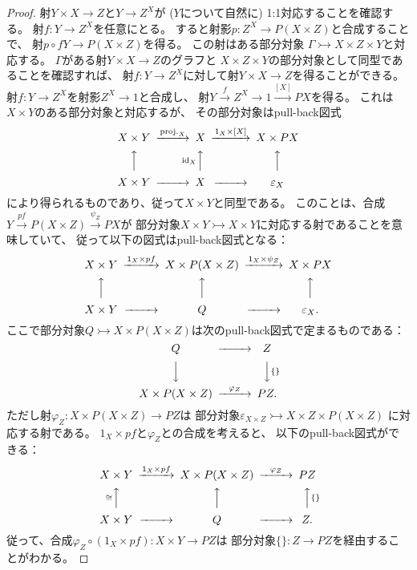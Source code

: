 \documentclass[uplatex]{jsarticle}
\theoremstyle{definition}
\def\ep{\varepsilon}
\def\id{\mathrm{id}}
\newcommand{\rtot}{\rightarrowtail}
\begin{document}
\begin{proof}
  射\(Y\times X\to Z\)と\(Y\to Z^X\)が (\(Y\)について自然に) 1:1対応することを確認する。
  射\(f:Y\to Z^X\)を任意にとる。
  すると射影\(p:Z^X \to P(X\times Z)\)と合成することで、
  射\(p\circ f Y\to P(X\times Z)\)を得る。
  この射はある部分対象
  \(\Gamma \rtot X\times Z\times Y\)と対応する。
  \(\Gamma\)がある射\(Y\times X\to Z\)のグラフと
  \(X\times Z\times Y\)の部分対象として同型であることを確認すれば、
  射\(f:Y\to Z^X\)に対して射\(Y\times X\to Z\)を得ることができる。
  射\(f:Y\to Z^X\)を射影\(Z^X\to 1\)と合成し、
  射\(Y\xrightarrow{f} Z^X\to 1 \xrightarrow{[X]} PX\)を得る。
  これは\(X\times Y\)のある部分対象と対応するが、
  その部分対象はpull-back図式
  \[
  \begin{CD}
    X\times Y @>\text{proj.}_X>> X @> 1_X \times [X] >> X \times PX \\
    @AAA @A \id_X AA @AAA \\
    X\times Y @>>> X @>>> \ep_X
  \end{CD}
  \]
  により得られるものであり、従って\(X\times Y\)と同型である。
  このことは、合成
  \(Y\xrightarrow{pf} P(X\times Z) \xrightarrow{\psi_Z} PX\)が
  部分対象\(X\times Y\rtot X\times Y\)に対応する射であることを意味していて、
  従って以下の図式はpull-back図式となる：
  \[
  \begin{CD}
    X\times Y @> 1_X\times pf >> X\times P(X\times Z) @>1_X\times \psi_Z >> X\times PX \\
    @AAA @AAA @AAA \\
    X\times Y @>>> Q @>>> \ep_X.
  \end{CD}
  \]
  ここで部分対象\(Q \rtot X\times P(X\times Z)\)は次のpull-back図式で定まるものである：
  \[
  \begin{CD}
    Q @>>> Z \\
    @VVV @VV\{\}V \\
    X\times P(X\times Z) @>\varphi_Z>> PZ.
  \end{CD}
  \]
  ただし射\(\varphi_Z: X\times P(X\times Z)\to PZ\)は
  部分対象\(\ep_{X\times Z}\rtot X\times Z\times P(X\times Z)\)
  に対応する射である。
  \(1_X\times pf\)と\(\varphi_Z\)との合成を考えると、
  以下のpull-back図式ができる：
  \[
  \begin{CD}
    X\times Y @> 1_X\times pf >> X\times P(X\times Z) @>\varphi_Z>> PZ \\
    @A\cong AA @AAA @AA\{\}A \\
    X\times Y @>>> Q @>>> Z.
  \end{CD}
  \]
  従って、合成\(\varphi_Z\circ (1_X\times pf) : X\times Y \to PZ\)は
  部分対象\(\{\}:Z\to PZ\)を経由することがわかる。

\end{proof}
\end{document}
